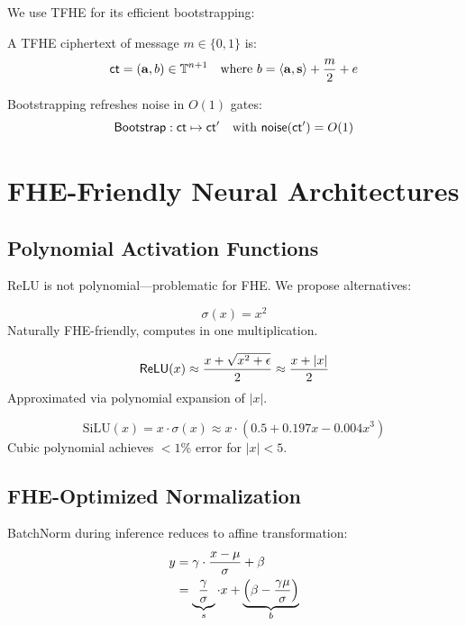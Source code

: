 \documentclass{../shared/luxfhe}
\begin{document}
We use TFHE for its efficient bootstrapping:

\begin{definition}
A TFHE ciphertext of message $m \in \{0,1\}$ is:
\[
\mathsf{ct} = (\mathbf{a}, b) \in \mathbb{T}^{n+1} \quad \text{where } b = \langle \mathbf{a}, \mathbf{s} \rangle + \frac{m}{2} + e
\]
\end{definition}

Bootstrapping refreshes noise in $O(1)$ gates:
\[
\mathsf{Bootstrap}: \mathsf{ct} \mapsto \mathsf{ct}' \quad \text{with } \mathsf{noise}(\mathsf{ct}') = O(1)
\]

\section{FHE-Friendly Neural Architectures}

\subsection{Polynomial Activation Functions}

ReLU is not polynomial---problematic for FHE. We propose alternatives:

\begin{definition}
\[
\sigma(x) = x^2
\]
Naturally FHE-friendly, computes in one multiplication.
\end{definition}

\begin{definition}
\[
\mathsf{ReLU}(x) \approx \frac{x + \sqrt{x^2 + \epsilon}}{2} \approx \frac{x + |x|}{2}
\]
Approximated via polynomial expansion of $|x|$.
\end{definition}

\begin{definition}
\[
\text{SiLU}(x) = x \cdot \sigma(x) \approx x \cdot (0.5 + 0.197x - 0.004x^3)
\]
Cubic polynomial achieves $<1\%$ error for $|x| < 5$.
\end{definition}

\subsection{FHE-Optimized Normalization}

BatchNorm during inference reduces to affine transformation:
\begin{align}
y &= \gamma \cdot \frac{x - \mu}{\sigma} + \beta \\
&= \underbrace{\frac{\gamma}{\sigma}}_{s} \cdot x + \underbrace{\left(\beta - \frac{\gamma \mu}{\sigma}\right)}_{b}
\end{align}
\end{document}

